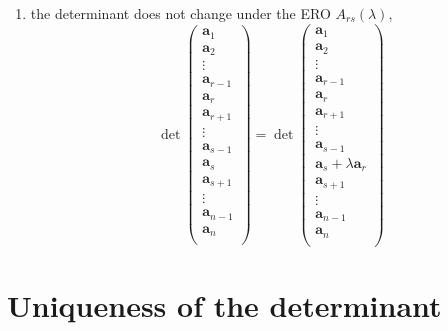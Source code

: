 \begin{enumerate}
    \item the determinant does not change under the ERO $A_{rs}(\lambda)$,
    \[
        \det{
            \begin{pmatrix}
                \bm a_1\\
                \bm a_2\\
                \vdots\\
                \bm a_{r-1}\\
                \bm a_r\\
                \bm a_{r+1}\\
                \vdots\\
                \bm a_{s-1}\\
                \bm a_s\\
                \bm a_{s+1}\\
                \vdots\\
                \bm a_{n-1}\\
                \bm a_n\\
            \end{pmatrix}
        }
        =
        \det{
            \begin{pmatrix}
                \bm a_1\\
                \bm a_2\\
                \vdots\\
                \bm a_{r-1}\\
                \bm a_r\\
                \bm a_{r+1}\\
                \vdots\\
                \bm a_{s-1}\\
                \bm a_s+\lambda \bm a_r\\
                \bm a_{s+1}\\
                \vdots\\
                \bm a_{n-1}\\
                \bm a_n\\
            \end{pmatrix}
        }
    \]
\end{enumerate}


\section{Uniqueness of the determinant}

